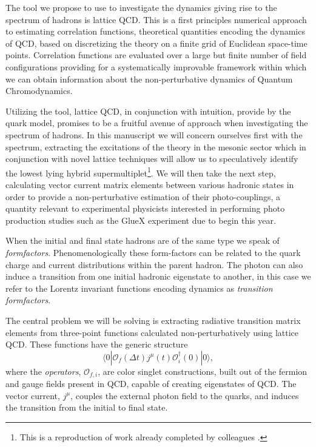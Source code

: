 The tool we propose to use to investigate the dynamics giving rise to the spectrum of hadrons is lattice QCD. This is a first principles numerical approach to estimating correlation functions, theoretical quantities encoding the dynamics of QCD, based on discretizing the theory on a finite grid of Euclidean space-time points. Correlation functions are evaluated over a large but finite number of field configurations providing for a systematically improvable framework within which we can obtain information about the non-perturbative dynamics of Quantum Chromodynamics. 

Utilizing the tool, lattice QCD, in conjunction with intuition, provide by the quark model, promises to be a fruitful avenue of approach when investigating the spectrum of hadrons. In this manuscript we will concern ourselves first with the spectrum, extracting the excitations of the theory in the mesonic sector which in conjunction with novel lattice techniques will allow us to speculatively identify the lowest lying hybrid supermultiplet\footnote{This is a reproduction of work already completed by colleagues \cite{Dudek:2011bn}.}.  We will then take the next step, calculating vector current matrix elements between various hadronic states in order to provide a non-perturbative estimation of their photo-couplings, a quantity relevant to experimental physicists interested in performing photo production studies such as the GlueX experiment due to begin this year. 

When the initial and final state hadrons are of the same type we speak of \emph{formfactors}. Phenomenologically these form-factors can be related to the quark charge and current distributions within the parent hadron. The photon can also induce a transition from one initial hadronic eigenstate to another, in this case we refer to the Lorentz invariant functions encoding dynamics as \emph{transition formfactors}. 

The central problem we will be solving is extracting radiative transition matrix elements from three-point functions calculated non-perturbatively using lattice QCD. These functions have the generic structure
\begin{equation*}
\langle 0 | \mathcal{O}_f(\Delta t) j^\mu(t) \mathcal{O}^\dagger_i(0) | 0 \rangle, 
\end{equation*}
where the \emph{operators}, $\mathcal{O}_{f,i}$, are color singlet constructions, built out of the fermion and gauge fields present in QCD, capable of creating eigenstates of QCD. The vector current,  $j^\mu$, couples the external photon field to the quarks, and induces the transition from the initial to final state. 

